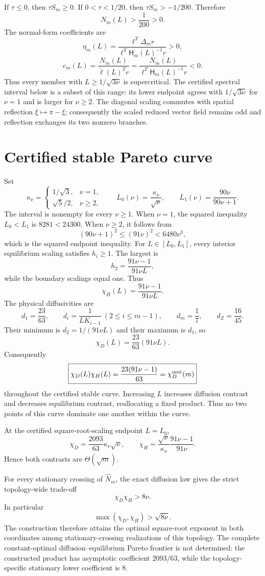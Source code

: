 If $\tau\le0$, then $\tau S_m\ge0$.  If $0<\tau<1/20$, then
$\tau S_m>-1/200$.  Therefore
\[
 N_m(L)>\frac1{200}>0.
\]
The normal-form coefficients are
\[
 \eta_m(L)=\frac{\ell^T\Delta_m r}
 {\ell^T\mathsf H_m(L)^{-1}r}>0,
\]
\[
 c_m(L)=\frac{N_m(L)}{\widetilde\ell(L)^Tr}
 =\frac{N_m(L)}{\ell^T\mathsf H_m(L)^{-1}r}<0.
\]
Thus every member with $L\ge1/\sqrt{3\nu}$ is supercritical.  The certified
spectral interval below is a subset of this range: its lower endpoint agrees
with $1/\sqrt{3\nu}$ for $\nu=1$ and is larger for $\nu\ge2$.
The diagonal scaling commutes with spatial reflection
$\xi\mapsto\pi-\xi$; consequently the scaled reduced vector field remains
odd and reflection exchanges its two nonzero branches.


\section*{Certified stable Pareto curve}
Set
\[
 \kappa_\nu=\begin{cases}
 1/\sqrt3,&\nu=1,\\
 \sqrt5/2,&\nu\ge2,
 \end{cases}
 \qquad
 L_0(\nu)=\frac{\kappa_\nu}{\sqrt\nu},
 \qquad L_1(\nu)=\frac{90\nu}{90\nu+1}.
\]
The interval is nonempty for every $\nu\ge1$.  When $\nu=1$, the squared
inequality $L_0<L_1$ is $8281<24300$.  When $\nu\ge2$, it follows from
\[
 (90\nu+1)^2\le(91\nu)^2<6480\nu^3,
\]
which is the squared endpoint inequality.  For
$L\in[L_0,L_1]$, every interior equilibrium scaling satisfies $h_i\ge1$.
The largest is
\[
 h_2=\frac{91\nu-1}{91\nu L},
\]
while the boundary scalings equal one.  Thus
\[
 \chi_H(L)=\frac{91\nu-1}{91\nu L}.
\]
The physical diffusivities are
\[
 d_1=\frac{23}{63},
 \qquad d_i=\frac1{LK_{i-1}}
 \ (2\le i\le m-1),
 \qquad d_m=\frac17,
 \qquad d_Z=\frac{16}{45}.
\]
Their minimum is $d_2=1/(91\nu L)$ and their maximum is $d_1$, so
\[
 \chi_D(L)=\frac{23}{63}(91\nu L).
\]
Consequently
\[
 \boxed{\chi_D(L)\chi_H(L)=\frac{23(91\nu-1)}{63}
 =\chi_D^{\rm unit}(m)}
\]
throughout the certified stable curve.  Increasing $L$ increases diffusion
contrast and decreases equilibrium contrast, reallocating a fixed product.
Thus no two points of this curve dominate one another within the curve.

At the certified square-root-scaling endpoint $L=L_0$,
\[
 \chi_D=\frac{2093}{63}\kappa_\nu\sqrt{\nu},
 \qquad
 \chi_H=\frac{\sqrt\nu}{\kappa_\nu}\frac{91\nu-1}{91\nu}.
\]
Hence both contrasts are $\Theta(\sqrt m)$.

For every stationary crossing of $\widehat N_m$, the exact diffusion law gives
the strict topology-wide trade-off
\[
 \chi_D\chi_H>8\nu.
\]
In particular
\[
 \max(\chi_D,\chi_H)>\sqrt{8\nu}.
\]
The construction therefore attains the optimal square-root exponent in both
coordinates among stationary-crossing realizations of this topology.  The
complete constant-optimal diffusion--equilibrium Pareto frontier is not
determined: the constructed product has asymptotic coefficient $2093/63$,
while the topology-specific stationary lower coefficient is $8$.
